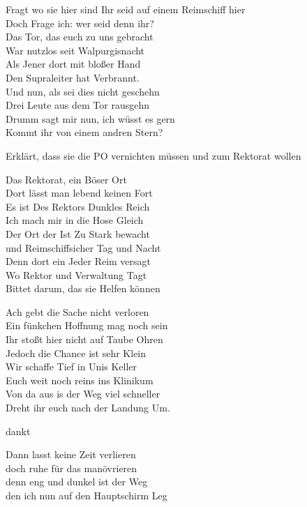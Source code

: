 \begin{verseplay}[3em]
\s{\Legolars} Fragt wo sie hier sind
\s{\Paul} Ihr seid auf einem Reimschiff hier\\ Doch Frage ich: wer seid denn ihr?\\ Das Tor, das euch zu uns gebracht\\ War nutzlos seit Walpurgisnacht\\ Als Jener dort mit bloßer Hand \\ Den Supraleiter hat Verbrannt.\\ Und nun, als sei dies nicht geschehn \\ Drei Leute aus dem Tor rausgehn\\ Drumm sagt mir nun, ich wüsst es gern\\ Kommt ihr von einem andren Stern?

\s{\Legolars} Erklärt, dass sie die PO vernichten müssen und zum Rektorat wollen

\s{\Spock} Das Rektorat, ein Böser Ort\\ Dort lässt man lebend keinen Fort\\ Es ist Des Rektors Dunkles Reich\\ Ich mach mir in die Hose Gleich\\ Der Ort der Ist Zu Stark bewacht\\ und Reimschiffsicher Tag und Nacht\\ Denn dort ein Jeder Reim versagt\\ Wo Rektor und Verwaltung Tagt\\ 

\s{\Frodo} Bittet darum, das sie Helfen können

\s{\Paul} Ach gebt die Sache nicht verloren\\ Ein fünkchen Hoffnung mag noch sein\\ Ihr stoßt hier nicht auf Taube Ohren\\ Jedoch die Chance ist sehr Klein\\ Wir schaffe Tief in Unis Keller\\ Euch weit noch reins ins Klinikum\\ Von da aus is der Weg viel schneller\\ Dreht ihr euch nach der Landung Um.

\s{\Frodo} dankt

\s{\Paul} Dann lasst keine Zeit verlieren\\ doch ruhe für das manövrieren\\ denn eng und dunkel ist der Weg\\ den ich nun auf den Hauptschirm Leg 

\end{verseplay}

